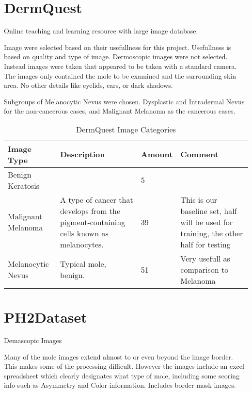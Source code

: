 \section{DermQuest}

Online teaching and learning resource with large image database.

Image were selected based on their usefullness for this project. Usefullness is based on quality and type of image. Dermoscopic images were not selected. Instead images were taken that appeared to be taken with a standard camera. The images only contained the mole to be examined and the surrounding skin area. No other details like eyelids, ears, or dark shadows.

Subgroups of Melanocytic Nevus were chosen. Dysplastic and Intradermal Nevus for the non-cancerous cases, and Malignant Melanoma as the cancerous cases.

\begin{table}[H]
\small
    \begin{tabular}{ | l | p{3.5cm} | l | p{3.5cm} |}
    \hline
    Image Type &  Description & Amount & Comment\\ \hline
    Benign Keratosis &
        & 5 &  \\ \hline
    Malignant Melanoma & A type of cancer that develops from the pigment-containing cells known as melanocytes.
        & 39 & This is our baseline set, half will be used for training, the other half for testing \\ \hline
    Melanocytic Nevus & Typical mole, benign.
        & 51 & Very usefull as comparison to Melanoma \\ \hline

    \end{tabular}

    \caption{DermQuest Image Categories}
    \label{fig:dquest_cat}

\end{table}

\section{PH2Dataset}

Demascopic Images

Many of the mole images extend almost to or even beyond the image border. This makes some of the processing difficult. However the images include an excel spreadsheet which clearly designates what type of mole, including some scoring info such as Asymmetry and Color information.
Includes border mask images.

